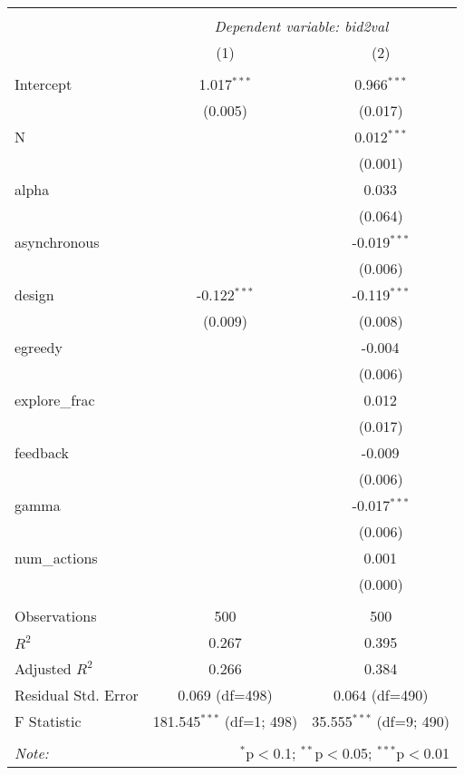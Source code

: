 \begin{table}[!htbp] \centering
\begin{tabular}{@{\extracolsep{5pt}}lcc}
\\[-1.8ex]\hline
\hline \\[-1.8ex]
& \multicolumn{2}{c}{\textit{Dependent variable: bid2val}} \
\cr \cline{2-3}
\\[-1.8ex] & (1) & (2) \\
\hline \\[-1.8ex]
 Intercept & 1.017$^{***}$ & 0.966$^{***}$ \\
& (0.005) & (0.017) \\
 N & & 0.012$^{***}$ \\
& & (0.001) \\
 alpha & & 0.033$^{}$ \\
& & (0.064) \\
 asynchronous & & -0.019$^{***}$ \\
& & (0.006) \\
 design & -0.122$^{***}$ & -0.119$^{***}$ \\
& (0.009) & (0.008) \\
 egreedy & & -0.004$^{}$ \\
& & (0.006) \\
 explore_frac & & 0.012$^{}$ \\
& & (0.017) \\
 feedback & & -0.009$^{}$ \\
& & (0.006) \\
 gamma & & -0.017$^{***}$ \\
& & (0.006) \\
 num_actions & & 0.001$^{}$ \\
& & (0.000) \\
\hline \\[-1.8ex]
 Observations & 500 & 500 \\
 $R^2$ & 0.267 & 0.395 \\
 Adjusted $R^2$ & 0.266 & 0.384 \\
 Residual Std. Error & 0.069 (df=498) & 0.064 (df=490) \\
 F Statistic & 181.545$^{***}$ (df=1; 498) & 35.555$^{***}$ (df=9; 490) \\
\hline
\hline \\[-1.8ex]
\textit{Note:} & \multicolumn{2}{r}{$^{*}$p$<$0.1; $^{**}$p$<$0.05; $^{***}$p$<$0.01} \\
\end{tabular}
\end{table}